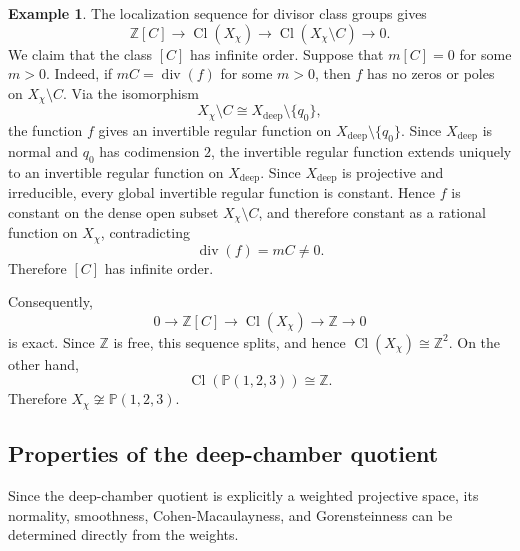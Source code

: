 \documentclass[12pt, reqno]{amsart}
\theoremstyle{plain}
\numberwithin{equation}{section}
\theoremstyle{definition}
\newtheorem{example}{Example}
\begin{document}
\begin{example}
The localization sequence for divisor class groups gives
\[
\mathbb Z[C]
\longrightarrow
\operatorname{Cl}(X_\chi)
\longrightarrow
\operatorname{Cl}(X_\chi\setminus C)
\longrightarrow0.
\]
We claim that the class \([C]\) has infinite order. Suppose that $m[C]=0$
for some \(m>0\). Indeed, if \(mC=\operatorname{div}(f)\)
for some \(m>0\), then \(f\) has no zeros or poles on \(X_\chi\setminus C\).
Via the isomorphism
\[
X_\chi\setminus C\cong X_{\mathrm{deep}}\setminus\{q_0\},
\]
the function \(f\) gives an invertible regular function on
\(X_{\mathrm{deep}}\setminus\{q_0\}\). Since \(X_{\mathrm{deep}}\) is normal and \(q_0\) has codimension \(2\),
the invertible regular function extends uniquely to an invertible
regular function on \(X_{\mathrm{deep}}\). Since
\(X_{\mathrm{deep}}\) is projective and irreducible, every global
invertible regular function is constant. Hence \(f\) is constant on
the dense open subset \(X_\chi\setminus C\), and therefore constant
as a rational function on \(X_\chi\), contradicting
\[
\operatorname{div}(f)=mC\neq0.
\]
Therefore \([C]\) has infinite order.

Consequently,
\[
0
\longrightarrow
\mathbb Z[C]
\longrightarrow
\operatorname{Cl}(X_\chi)
\longrightarrow
\mathbb Z
\longrightarrow0
\]
is exact. Since \(\mathbb Z\) is free, this sequence splits, and
hence $\operatorname{Cl}(X_\chi)
\cong
\mathbb Z^2.$
On the other hand,
\[
\operatorname{Cl}(\mathbb P(1,2,3))
\cong\mathbb Z.
\]
Therefore $X_\chi\not\cong\mathbb P(1,2,3).$
\end{example}

\subsection{Properties of the deep-chamber quotient}
Since the deep-chamber quotient is explicitly a weighted projective
space, its normality, smoothness, Cohen-Macaulayness, and
Gorensteinness can be determined directly from the weights.
\end{document}
